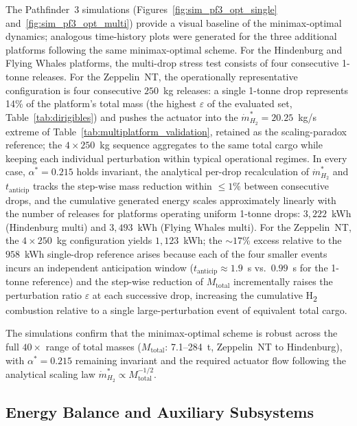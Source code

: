 \documentclass[applsci,article,submit,pdftex,moreauthors]{Definitions/mdpi}
\newcommand{\dotmstar}{\dot{m}_{H_2}^{*}}
\newcommand{\addedR}[1]{\textcolor{green!60!black}{#1}}
\begin{document}
\addedR{The Pathfinder~3 simulations (Figures~\ref{fig:sim_pf3_opt_single} and~\ref{fig:sim_pf3_opt_multi}) provide a visual baseline of the minimax-optimal dynamics; analogous time-history plots were generated for the three additional platforms following the same minimax-optimal scheme. For the Hindenburg and Flying Whales platforms, the multi-drop stress test consists of four consecutive 1-tonne releases. For the Zeppelin~NT, the operationally representative configuration is four consecutive $250$~kg releases: a single 1-tonne drop represents 14\% of the platform's total mass (the highest $\varepsilon$ of the evaluated set, Table~\ref{tab:dirigibles}) and pushes the actuator into the $\dotmstar = 20.25$~kg/s extreme of Table~\ref{tab:multiplatform_validation}, retained as the scaling-paradox reference; the $4\times250$~kg sequence aggregates to the same total cargo while keeping each individual perturbation within typical operational regimes. In every case, $\alpha^* = 0.215$ holds invariant, the analytical per-drop recalculation of $\dotmstar$ and $t_\text{anticip}$ tracks the step-wise mass reduction within $\leq 1\%$ between consecutive drops, and the cumulative generated energy scales approximately linearly with the number of releases for platforms operating uniform 1-tonne drops: $3{,}222$~kWh (Hindenburg multi) and $3{,}493$~kWh (Flying Whales multi). For the Zeppelin~NT, the $4\times250$~kg configuration yields $1{,}123$~kWh; the ${\sim}17\%$ excess relative to the $958$~kWh single-drop reference arises because each of the four smaller events incurs an independent anticipation window ($t_\text{anticip}\approx1.9$~s vs.\ $0.99$~s for the 1-tonne reference) and the step-wise reduction of $M_\text{total}$ incrementally raises the perturbation ratio $\varepsilon$ at each successive drop, increasing the cumulative H\textsubscript{2} combustion relative to a single large-perturbation event of equivalent total cargo.}

\addedR{The simulations confirm that the minimax-optimal scheme is robust across the full $40\times$ range of total masses ($M_\text{total}$: 7.1--284~t, Zeppelin~NT to Hindenburg), with $\alpha^* = 0.215$ remaining invariant and the required actuator flow following the analytical scaling law $\dotmstar \propto M_\text{total}^{-1/2}$.}

\subsection{Energy Balance and Auxiliary Subsystems}
\label{sec:balance}
\end{document}
